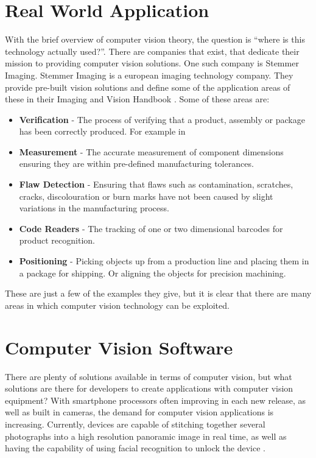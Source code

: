 \documentclass[11pt,oneside]{report}
\begin{document}
				\section{Real World Application}
					With the brief overview of computer vision theory, the question is ``where is this technology actually used?''.
					There are companies that exist, that dedicate their mission to providing computer vision solutions.
					One such company is Stemmer Imaging.
					Stemmer Imaging is a european imaging technology company.
					They provide pre-built vision solutions and define some of the application areas of these in their Imaging and Vision Handbook \cite{cat:stemmer}.
					Some of these areas are:
					\begin{itemize}
						\item \textbf{Verification} - The process of verifying that a product, assembly or package has been correctly produced. For example in 
						\item \textbf{Measurement} - The accurate measurement of component dimensions ensuring they are within pre-defined manufacturing tolerances.
						\item \textbf{Flaw Detection} - Ensuring that flaws such as contamination, scratches, cracks, discolouration or burn marks have not been caused by slight variations in the manufacturing process.
						\item \textbf{Code Readers} - The tracking of one or two dimensional barcodes for product recognition.
						\item \textbf{Positioning} - Picking objects up from a production line and placing them in a package for shipping. Or aligning the objects for precision machining.
					\end{itemize}
					These are just a few of the examples they give, but it is clear that there are many areas in which computer vision technology can be exploited.
					
				\section{Computer Vision Software}
					There are plenty of solutions available in terms of computer vision, but what solutions are there for developers to create applications with computer vision equipment?
					With smartphone processors often improving in each new release, as well as built in cameras, the demand for computer vision applications is increasing.
				Currently, devices are capable of stitching together several photographs into a high resolution panoramic image in real time, as well as having the capability of using facial recognition to unlock the device \cite{journal:face}.
					
\end{document}

